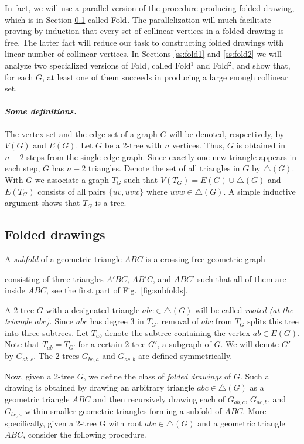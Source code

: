 \documentclass[reqno,12pt]{amsart}
\newcommand{\foldn}[1]{{\sc Fold}$^{#1}$}
\newcommand{\edit}[1]{}
\begin{document}
In fact, we will use a parallel version of the procedure producing folded drawing,
which is in Section \ref{ss:fold} called \foldn{}. The parallelization will much facilitate
proving by induction that every set of collinear vertices in a folded drawing is free.
The latter fact will reduce our task to constructing folded drawings with linear number
of collinear vertices. In Sections \ref{ss:fold1} and \ref{ss:fold2} 
we will analyze two specialized versions of \foldn{}, called
\foldn{1} and \foldn{2}, and show that, for each $G$, at least one of them succeeds
in producing a large enough collinear set.

\medskip

\paragraph{\it Some definitions.}

The vertex set and the edge set of a graph $G$ will be denoted, respectively, by
$V(G)$ and $E(G)$.
Let $G$ be a 2-tree with $n$ vertices. Thus, $G$ is obtained in $n-2$ steps
from the single-edge graph. Since exactly one new triangle appears in each step,
$G$ has $n-2$ triangles. Denote the set of all triangles in $G$ by $\triangle(G)$.
With $G$ we associate a graph $T_G$ such that $V(T_G)=E(G)\cup\triangle(G)$
and $E(T_G)$ consists of all pairs $\{uv,uvw\}$ where $uvw\in\triangle(G)$.
A simple inductive argument shows that $T_G$ is a tree.


\subsection{Folded drawings}\label{ss:fold}

A \emph{subfold} of a geometric triangle $ABC$ is a crossing-free geometric graph 
\edit{introduced?}
consisting of three triangles $A'BC$, $AB'C$, and $ABC'$ such that all of them are
inside $ABC$, see the first part of Fig.~\ref{fig:subfolds}.

A 2-tree $G$ with a designated triangle $abc\in\triangle(G)$ will be called
\emph{rooted (at the triangle $abc$)}. Since $abc$ has degree 3 in $T_G$, removal of 
$abc$ from $T_G$ splits this tree into three subtrees. Let $T_{ab}$ denote
the subtree containing the vertex $ab\in E(G)$. Note that $T_{ab}=T_{G'}$
for a certain 2-tree $G'$, a subgraph of $G$. We will denote $G'$ by $G_{ab,c}$.
The 2-trees $G_{bc,a}$ and $G_{ac,b}$ are defined symmetrically.

Now, given a 2-tree $G$, we define the class of \emph{folded drawings} of $G$.
Such a drawing is obtained by drawing an arbitrary triangle $abc\in\triangle(G)$
as a geometric triangle $ABC$ and then recursively drawing each of
$G_{ab,c}$, $G_{ac,b}$, and $G_{bc,a}$ within smaller geometric triangles
forming a subfold of $ABC$. More specifically, given a 2-tree G with root $abc\in\triangle(G)$
and a geometric triangle $ABC$, consider the following procedure.
\end{document}
